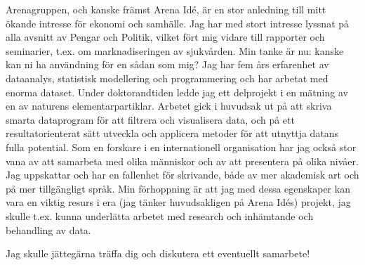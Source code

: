 \documentclass[11pt, a4paper]{../awesome-cv} %
\begin{document}
\begin{cvletter}
Arenagruppen, och kanske främst Arena Idé, är en stor anledning till mitt ökande intresse för ekonomi och samhälle. %
Jag har med stort intresse lyssnat på alla avsnitt av Pengar och Politik, vilket fört mig vidare till rapporter och seminarier, t.ex. om marknadiseringen av sjukvården. %
Min tanke är nu: kanske kan ni ha användning för en sådan som mig?
Jag har fem års erfarenhet av dataanalys, statistisk modellering och programmering och har arbetat med enorma dataset.
Under doktorandtiden ledde jag ett delprojekt i en mätning av en av naturens elementarpartiklar. 
Arbetet gick i huvudsak ut på att skriva smarta dataprogram för att filtrera och visualisera data, och på ett resultatorienterat sätt utveckla och applicera metoder för att utnyttja datans fulla potential.
Som en forskare i en internationell organisation har jag också stor vana av att samarbeta med olika människor och av att presentera på olika nivåer. %
Jag uppskattar och har en fallenhet för skrivande, både av mer akademisk art och på mer tillgängligt språk.
Min förhoppning är att jag med dessa egenskaper kan vara en viktig resurs i era (jag tänker huvudsakligen på Arena Idés) projekt, jag skulle t.ex. kunna underlätta arbetet med research och inhämtande och behandling av data. 

Jag skulle jättegärna träffa dig och diskutera ett eventuellt samarbete!

\end{cvletter}


\makeletterclosing %
\end{document}
